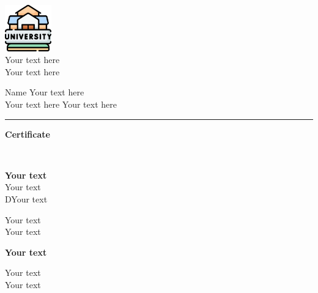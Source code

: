 \documentclass[
11pt, %
english, %
onehalfspacing, %
nolistspacing, %
liststotoc, %
toctotoc, %
headsepline, %
]{MastersDoctoralThesis} %
\theoremstyle{definition}
\begin{document}
\begin{center}
    \includegraphics[width=2cm,height=2cm]{Figures/cu_logo.jpg}\\
    Your text here\\
    Your text here
\end{center}
%
Name 
\hfill
Your text here\\
Your text here
\hfill
Your text here 
%
\vspace*{.01\textheight}
\hrule
\vspace*{.02\textheight}
%
\begin{center}
 \LARGE{\textbf{Certificate}}   
\end{center}
%
\vspace*{.04\textheight}
\blindtext 
\vspace*{.04\textheight}\\
\begin{flushright}
\textbf{Your text}\\
Your text\\
DYour text\\

\end{flushright}
\begin{flushleft}
Your text\\
Your text
\end{flushleft}


\begin{declaration}
\addchaptertocentry{\authorshipname} %
%
\vspace*{.06\textheight}
\noindent 
\blindtext 
%
\vspace*{.04\textheight}
\begin{flushright}
    \textbf{Your text}\\
\end{flushright}
\begin{flushleft}
    Your text\\
    Your text
\end{flushleft}

\end{declaration}
\end{document}
